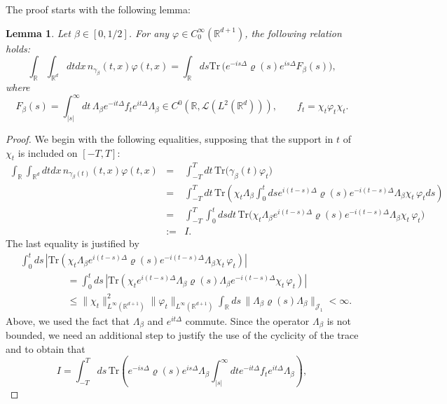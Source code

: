 \documentclass[12pt]{article}
\newtheorem{lemma}[theorem]{Lemma}
\def \Rm {\mathbb R}
\newcommand{\calL}{\mathcal L}
\newcommand{\Tr}{\textrm{Tr}}
\newcommand{\calJ}{\mathcal J}
\newcommand{\bee}{\begin{eqnarray*}}
\newcommand{\eee}{\end{eqnarray*}}
\begin{document}
The proof starts with the following lemma:
\begin{lemma} \label{expdens} Let $\beta \in [0,1/2]$. For any $\varphi\in C_0^\infty(\Rm^{d+1})$, the following relation holds:
$$
\int_{\Rm} \int_{\Rm^d}  dt dx\, n_{\gamma_\beta}(t,x) \varphi(t,x) =\int_\Rm ds \Tr \, \big(  e^{-i s \Delta} \varrho(s) e^{is \Delta} F_\beta(s) \big),
$$
where
$$
F_\beta(s)=\int_{|s|}^\infty dt \, \Lambda_{\beta}e^{-i t \Delta }f_t e^{i t \Delta } \Lambda_{\beta} \in C^0(\Rm,\calL(L^2(\Rm^d))), \qquad f_t=\chi_t \varphi_t \chi_t.
$$
\end{lemma}
\begin{proof}
We begin with the following equalities, supposing that the support in $t$ of $\chi_t$ is included  on $[-T,T]$:
\bee
\int_{\Rm} \int_{\Rm^d}  dt dx \, n_{\gamma_\beta(t)}(t,x) \varphi(t,x) &=& \int_{-T}^T dt \, \Tr \big( \gamma_\beta(t) \varphi_t \big)\\
&=&\int_{-T}^T dt \,\Tr \left( \chi_t \Lambda_{\beta} \int_0^t ds e^{i(t- s) \Delta} \varrho(s) e^{-i (t-s) \Delta }\Lambda_{\beta} \chi_t \, \varphi_t ds \right)\\
&=&\int_{-T}^T \int_0^t ds dt \, \Tr \Big( \chi_t \Lambda_{\beta}e^{i(t- s) \Delta} \varrho(s)e^{-i (t-s) \Delta }\Lambda_{\beta}\chi_t \, \varphi_t  \Big)\\[2mm]
&:=&I.
\eee
The last equality is justified by 
\begin{align} \label{justi}
&\int_0^t ds \,\left|\Tr \left( \chi_t \Lambda_{\beta}e^{i(t- s) \Delta} \varrho(s)e^{-i (t-s) \Delta }\Lambda_{\beta}\chi_t \, \varphi_t  \right)\right| \\ \nonumber
&\hspace{2cm}=\int_0^t ds \,\left|\Tr \left( \chi_t e^{i(t- s) \Delta} \Lambda_{\beta} \varrho(s)\Lambda_{\beta} e^{-i (t-s) \Delta }\chi_t \, \varphi_t  \right)\right| \\ \nonumber
&\hspace{2cm} \leq \|\chi_t\|^2_{L^\infty(\Rm^{d+1})} \|\varphi_t \|_{L^\infty(\Rm^{d+1})} \int_\Rm ds\, \| \Lambda_{\beta} \varrho(s) \Lambda_{\beta} \|_{\calJ_1}  < \infty.
\end{align}
Above, we used the fact that $\Lambda_\beta$ and $e^{it \Delta}$ commute. Since the operator $\Lambda_\beta$ is not bounded, we need an additional step to justify the use of the cyclicity of the trace and to obtain that 
$$
I=\int_{-T}^T ds\,\Tr \left( e^{-i s \Delta} \varrho(s)e^{i s \Delta }  \Lambda_{\beta} \int_{|s|}^\infty dt  e^{-i t \Delta} f_t e^{i t \Delta} \Lambda_{\beta} \right),
$$
\end{proof}
\end{document}
